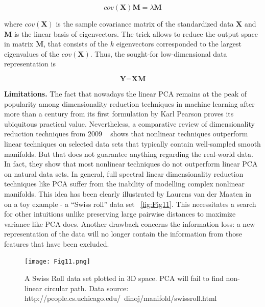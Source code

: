 \begin{equation}
  cov(\textbf{X})\textbf{M} = \lambda \textbf{M}
    \label{eq:equat6}
\end{equation}

where $cov(\textbf{X})$ is the sample covariance matrix of the standardized data $\textbf{X}$ and $\textbf{M}$ is the linear basis of eigenvectors. The trick allows to reduce the output space in matrix $\textbf{M}$, that consists of the $k$ eigenvectors corresponded to the largest eigenvalues of the $cov(\textbf{X})$. Thus, the sought-for low-dimensional data representation is 

\begin{equation}
  \textbf{Y} = \textbf{X}\textbf{M}
    \label{eq:equat7}
\end{equation}

\textbf{Limitations. }The fact that nowadays the linear PCA remains at the peak of popularity among dimensionality reduction techniques in machine learning after more than a century from its first formulation by Karl Pearson proves its ubiquitous practical value. Nevertheless, a comparative review of dimensionality reduction techniques from 2009 ~\cite{van2009dimensionality} shows that nonlinear techniques outperform linear techniques on selected data sets that typically contain well-sampled smooth manifolds. But that does not guarantee anything regarding the real-world data. In fact, they show that most nonlinear techniques do not outperform linear PCA on natural data sets. 
In general, full spectral linear dimensionality reduction techniques like PCA suffer from the inability of modelling complex nonlinear manifolds. This idea has been clearly illustrated by Laurens van der Maaten in ~\cite{maaten2008visualizing} on a toy example - a “Swiss roll” data set ~\autoref{fig:Fig11}. This necessitates a search for other intuitions unlike preserving large pairwise distances to maximize variance like PCA does. Another drawback concerns the information loss: a new representation of the data will no longer contain the information from those features that have been excluded.

\begin{figure}[H]
    \centering
    \texttt{[image: Fig11.png]}
    \caption{A Swiss Roll data set plotted in 3D space. PCA will fail to find non-linear circular path. Data source: http://people.cs.uchicago.edu/~dinoj/manifold/swissroll.html}
    \label{fig:Fig11}
\end{figure}


